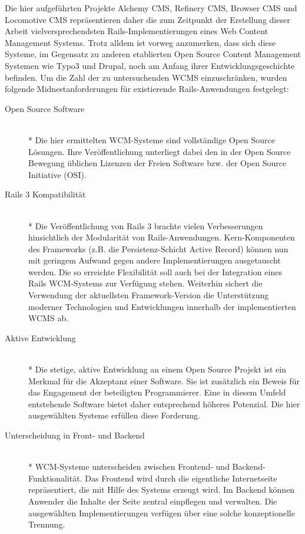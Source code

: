 Die hier aufgeführten Projekte Alchemy CMS, Refinery CMS, Browser CMS und Locomotive CMS repräsentieren daher die zum Zeitpunkt der Erstellung dieser Arbeit vielversprechendsten Rails-Implementierungen eines Web Content Management Systems. Trotz alldem ist vorweg anzumerken, dass sich diese Systeme, im Gegensatz zu anderen etablierten Open Source Content Management Systemen wie Typo3 und Drupal, noch am Anfang ihrer Entwicklungsgeschichte befinden.
\newline
\newline
Um die Zahl der zu untersuchenden WCMS einzuschränken, wurden folgende Midnestanforderungen für existierende Rails-Anwendungen festgelegt:
\begin{description}
\item[Open Source Software]\mbox{~}\\*
Die hier ermittelten WCM-Systeme sind vollständige Open Source Lösungen. Ihre Veröffentlichung unterliegt dabei den in der Open Source Bewegung üblichen Lizenzen der Freien Software bzw. der Open Source Initiative (OSI).
\item[Rails 3 Kompatibilität]\mbox{~}\\*
Die Veröffentlichung von Rails 3 brachte vielen Verbesserungen hinsichtlich der Modularität von Rails-Anwendungen. Kern-Komponenten des Frameworks (z.B. die Persistenz-Schicht Active Record) können nun mit geringem Aufwand gegen andere Implementierungen ausgetauscht werden. Die so erreichte Flexibilität soll auch bei der Integration eines Rails WCM-Systems zur Verfügung stehen.	Weiterhin sichert die Verwendung der aktuellsten Framework-Version die 	Unterstützung moderner Technologien und Entwicklungen innerhalb der implementierten WCMS ab.
\item[Aktive Entwicklung]\mbox{~}\\*
Die stetige, aktive Entwicklung an einem Open Source Projekt ist ein Merkmal für die Akzeptanz einer Software. Sie ist zusätzlich ein Beweis für das Engagement der beteiligten Programmierer. Eine in diesem Umfeld entstehende Software bietet daher entsprechend höheres Potenzial. Die  hier ausgewählten Systeme erfüllen diese Forderung.
\newpage
\item[Unterscheidung in Front- und Backend]\mbox{~}\\*
WCM-Systeme unterscheiden zwischen Frontend- und Backend-Funktionalität. Das Frontend wird durch die eigentliche Internetseite repräsentiert, die mit Hilfe des Systems erzeugt wird. Im Backend können Anwender die Inhalte der Seite zentral einpflegen und verwalten.
Die ausgewählten Implementierungen verfügen über eine solche konzeptionelle Trennung.
\end{description}

